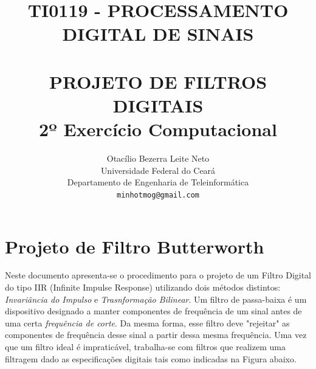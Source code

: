 \documentclass[a4paper,11pt]{article}
\title{ \normalsize \textsc{TI0119 - PROCESSAMENTO DIGITAL DE SINAIS} 
        \\[2.0cm]             
        \HRule{0.5pt} \\              
        \LARGE \textbf{\uppercase{Projeto de Filtros Digitais}\\2º Exerc\'icio Computacional}
        \HRule{2pt} \\[0.5cm]  
}
\author{
        Otacílio Bezerra Leite Neto\\   
        Universidade Federal do Ceará\\  
        Departamento de Engenharia de Teleinform\'atica\\
        \texttt{minhotmog@gmail.com} \\
}
\makeatletter
\numberwithin{figure}{section}
\numberwithin{equation}{section}
\numberwithin{table}{section}
\theoremstyle{definition}
\def\printtitle{
    {\centering \@title\par}}
\def\printauthor{
    {\centering \large \@author}}
\makeatother
\begin{document}
\thispagestyle{empty}       %

\printtitle                 %
    \vfill
\printauthor                %
\newpage

\setcounter{secnumdepth}{1}
\setcounter{tocdepth}{1}

\clearpage
\setcounter{page}{1}
\section{Projeto de Filtro Butterworth}

Neste documento apresenta-se o procedimento para o projeto de um Filtro Digital do tipo IIR (Infinite Impulse Response) utilizando dois métodos distintos: \textit{Invariância do Impulso} e \textit{Trasnformação Bilinear}. Um filtro de passa-baixa é um dispositivo designado a manter  componentes de frequência de um sinal antes de uma certa \textit{frequência de corte}. Da mesma forma, esse filtro deve "rejeitar" as componentes de frequência desse sinal a partir dessa mesma frequência. Uma vez que um filtro ideal é impraticável, trabalha-se com filtros que realizem uma filtragem dado as especificações digitais tais como indicadas na Figura abaixo.
\end{document}
